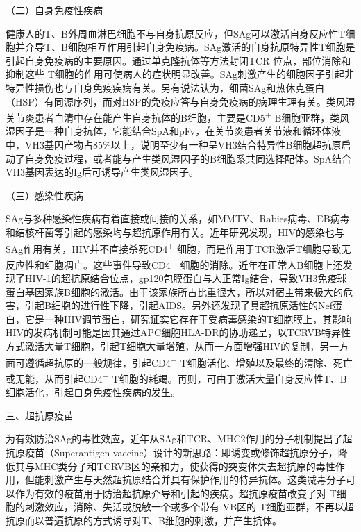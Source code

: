 （二）自身免疫性疾病

健康人的T、B外周血淋巴细胞不与自身抗原反应，但SAg可以激活自身反应性T细胞并介导T、B细胞相互作用引起自身免疫病。SAg激活的自身抗原特异性T细胞是引起自身免疫病的主要原因。通过单克隆抗体等方法封闭TCR
位点，部位消除和抑制这些
T细胞的作用可使病人的症状明显改善。SAg刺激产生的细胞因子引起非特异性损伤也与自身免疫疾病有关。另有说法认为，细菌SAg和热休克蛋白（HSP）有同源序列，而对HSP的免疫应答与自身免疫病的病理生理有关。类风湿关节炎患者血清中存在能产生自身抗体的B细胞，主要是CD5\textsuperscript{+}
B细胞亚群，类风湿因子是一种自身抗体，它能结合SpA和pFv，在关节炎患者关节液和循环体液中，VH3基因产物占85\%以上，说明至少有一种呈VH3结合特异性B细胞超抗原启动了自身免疫过程，或者能与产生类风湿因子的B细胞系共同选择配体。SpA结合VH3基因表达的Ig后可诱导产生类风湿因子。

（三）感染性疾病

SAg与多种感染性疾病有着直接或间接的关系，如MMTV、Rabies病毒、EB病毒和结核杆菌等引起的感染均与超抗原作用有关。近年研究发现，HIV的感染也与SAg作用有关，HIV并不直接杀死CD4\textsuperscript{+}
细胞，而是作用于TCR激活T细胞导致无反应性和细胞凋亡。这些事件导致CD4\textsuperscript{+}
细胞的消除。近年在正常人B细胞上还发现了HIV-1的超抗原结合位点，gp120包膜蛋白与人正常Ig结合，导致VH3免疫球蛋白基因家族B细胞的激活。由于该家族所占比重很大，所以对宿主带来极大的危害，引起B细胞的进行性下降，引起AIDS。另外还发现了具超抗原活性的Nef蛋白，它是一种HIV调节蛋白，研究证实它存在于受病毒感染的T细胞膜上，其影响HIV的发病机制可能是因其通过APC细胞HLA-DR的协助递呈，以TCRVB特异性方式激活大量T细胞，引起T细胞大量增殖，从而一方面增强HIV的复制，另一方面可遵循超抗原的一般规律，引起CD4\textsuperscript{+}
T细胞活化、增殖以及最终的清除、死亡或无能，从而引起CD4\textsuperscript{+}
T细胞的耗竭。再则，可由于激活大量自身反应性T、B细胞活化，引起自身免疫性疾病的发生。


\begin{center}
    {\large 三、超抗原疫苗}
\end{center}

为有效防治SAg的毒性效应，近年从SAg和TCR、MHC2作用的分子机制提出了超抗原疫苗（Superantigen
vaccine）设计的新思路：即诱变或修饰超抗原分子，降低其与MHC类分子和TCRVB区的亲和力，使获得的突变体失去超抗原的毒性作用，但能刺激产生与天然超抗原结合并具有保护作用的特异抗体。这类减毒分子可以作为有效的疫苗用于防治超抗原介导和引起的疾病。超抗原疫苗改变了对
T细胞的刺激效应，消除、失活或脱敏一个或多个带有 VB区的
T细胞亚群，不再以超抗原而以普遍抗原的方式诱导对T、B细胞的刺激，并产生抗体。

